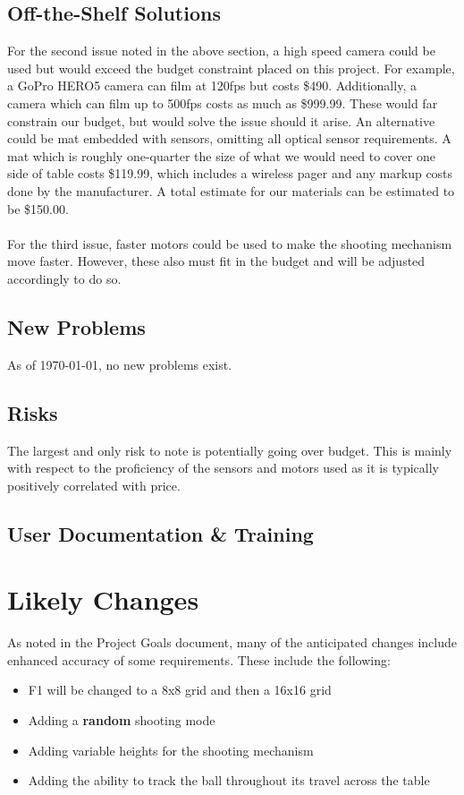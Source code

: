 \documentclass[11pt]{article}
\begin{document}
\subsection{Off-the-Shelf Solutions}
For the second issue noted in the above section, a high speed camera could be used but would exceed the budget constraint placed on this project. For example, a GoPro HERO5 camera can film at 120fps but costs \$490.%
Additionally, a camera which can film up to 500fps costs as much as \$999.99.%
These would far constrain our budget, but would solve the issue should it arise. An alternative could be mat embedded with sensors, omitting all optical sensor requirements. A mat which is roughly one-quarter the size of what we would need to cover one side of table costs \$119.99, which includes a wireless pager and any markup costs done by the manufacturer. A total estimate for our materials can be estimated to be \$150.00.\\\\
For the third issue, faster motors could be used to make the shooting mechanism move faster. However, these also must fit in the budget and will be adjusted accordingly to do so.
\subsection{New Problems}
As of \today, no new problems exist.
\subsection{Risks}
The largest and only risk to note is potentially going over budget. This is mainly with respect to the proficiency of the sensors and motors used as it is typically positively correlated with price. 
\subsection{User Documentation \& Training}
\section{Likely Changes}
As noted in the Project Goals document, many of the anticipated changes include enhanced accuracy of some requirements. These include the following:
\begin{itemize}
\item F1 will be changed to a 8x8 grid and then a 16x16 grid
\item Adding a \textbf{random} shooting mode
\item Adding variable heights for the shooting mechanism
\item Adding the ability to track the ball throughout its travel across the table
\end{itemize}
\end{document}
